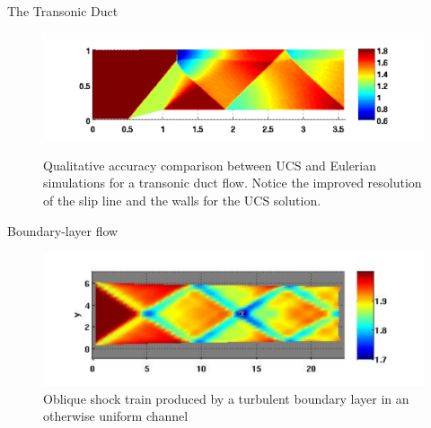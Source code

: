 \documentclass{beamer}
\begin{document}
\begin{frame}{The Transonic Duct}
\begin{figure}[htbp]
\begin{subfigmatrix}{2}
{   \includegraphics[height=.15\textheight]{shock_train_surfh02p0.pdf}}
   \end{subfigmatrix}
   \caption{Qualitative accuracy comparison between UCS and Eulerian simulations for a transonic duct flow. Notice the improved resolution of the slip line and the walls for the UCS solution.}
   \label{fig:duct_verification}
\end{figure}
\end{frame}

\begin{frame}{Boundary-layer flow}
\begin{figure}[htbp]
   \centering
   \includegraphics[width=\textwidth]{BL_shock_train.pdf}
   \caption{Oblique shock train produced by a turbulent boundary layer in an otherwise uniform channel}
   \label{fig:bl_shock_train}
\end{figure}
\end{frame}
\end{document}
